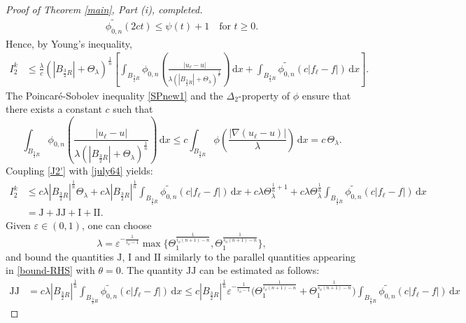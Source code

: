 \documentclass[leqno,11pt]{amsart}%
\numberwithin{equation}{section}
\newcommand{\eps}{\varepsilon}
\def\d{\mathrm{d}}
\def\dx{\d x}
\theoremstyle{definition}
\numberwithin{equation}{section}
\begin{document}
\begin{proof}[Proof of Theorem \ref{main}, Part (i), completed]
{\begin{align}
    \label{july63}
\widetilde{ \phi_{0,n}}(2ct) \leq \psi(t) +1 \quad \text{for $t \geq 0$.}
\end{align}
 Hence,  by Young's inequality,
\begin{align}\label{J2'}
        I_2^{k} & \le \frac{\lambda}{c}(|B_{\frac{3}{2}R}|+\Theta_\lambda)^{\frac{1}{n}}
        \left[ \int_{B_{\frac{3}{2}R}}\phi_{0,n}\left(\frac {| u_\ell- u|}{\lambda (|B_{\frac{3}{2}R}|+\Theta_\lambda)^{\frac{1}{n}}}\right)\,\dx+\int_{B_{\frac{3}{2}R}} \widetilde{ \phi_{0,n}}(c|f_\ell-f|)\,\dx\right].
        \end{align} 
The Poincar\'e-Sobolev inequality \eqref{SPnew1}
and the $\Delta_2$-property of $\phi$ ensure that there exists a constant $c$ such that
\begin{equation}\label{july64}
\int_{B_{\frac{3}{2}R}} \phi_{0,n}\left(\frac {| u_\ell- u|}{\lambda (|B_{\frac{3}{2}R}|+\Theta_\lambda)^{\frac{1}{n}}}\right)\,\dx
    \le
c\int_{B_{\frac{3}{2}R}} \phi\left(\frac{| \nabla(u_\ell- u)|}{\lambda}\right)\, \dx
    =
    c\, \Theta_\lambda.
  \end{equation}
Coupling \eqref{J2'} with \eqref{july64} yields:
\begin{align}\label{J2}
        I_2^{k}   &\leq c\lambda |B_{\frac{3}{2}R}|^{\frac{1}{n}} 
\Theta_\lambda+
c\lambda |B_{\frac{3}{2}R}|^{\frac{1}{n}}
\int_{B_{\frac{3}{2}R}} \widetilde{ \phi_{0,n}}(c|f_\ell-f|)\,\dx
     +c\lambda \Theta_\lambda^{\frac{1}{n}+1}  
     +c\lambda \Theta_\lambda^{\frac{1}{n}} 
     \int_{B_{\frac{3}{2}R}}  \widetilde{ \phi_{0,n}}(c|f_\ell-f|)\,\dx 
     \\ \nonumber & =\textrm{J}+ \textrm{JJ}+\textrm{I}+\textrm{II}.
    \end{align}
Given $\varepsilon \in (0, 1)$, 
one can choose
$$\lambda =\eps^{-\frac{1}{i_\phi-1}}\max\Big\{\Theta_1^\frac{1}{i_\phi(n+1)-n},\Theta_1^\frac{1}{{s_\phi}(n+1)-n}\Big\},$$
and
bound the quantities $\mathrm
{J}$, $\mathrm{I}$ and $\mathrm{II}$  similarly to the  parallel quantities appearing in \eqref{bound-RHS} with $\theta=0$. The quantity $\mathrm
{JJ}$ can be estimated as follows:
\begin{align}
    \label{oct11}
  \mathrm
{JJ}& =   c\lambda |B_{\frac{3}{2}R}|^{\frac{1}{n}}
\int_{B_{\frac{3}{2}R}} \widetilde{\phi_{0,n}}(c|f_\ell-f|)\,\dx \leq c
|B_{\frac{3}{2}R}|^{\frac{1}{n}}\eps^{-\frac{1}{{i_\phi}-1}}\Big(\Theta_1^\frac{1}{{i_\phi}(n+1)-n} +\Theta_1^\frac{1}{{s_\phi}(n+1)-n}\Big)\int_{B_{\frac{3}{2}R}} \widetilde{\phi_{0,n}}(c|f_\ell-f|)\,\dx 

\end{align}}
\end{proof}
\end{document}
